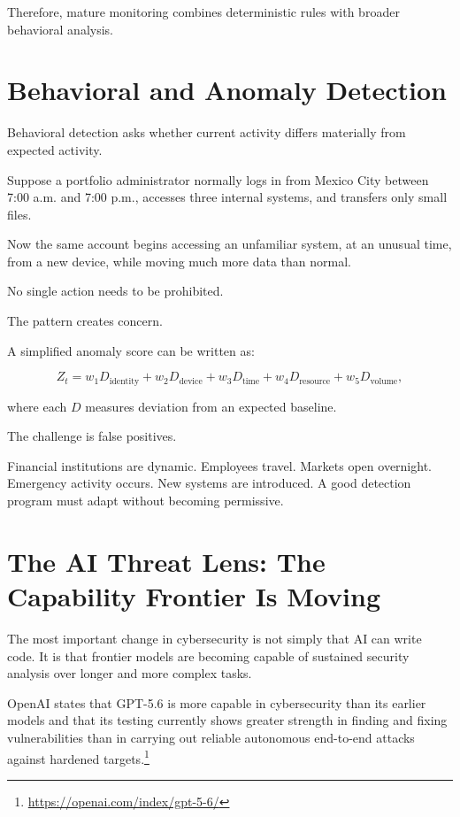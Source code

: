 Therefore, mature monitoring combines deterministic rules with broader behavioral analysis.

\section{Behavioral and Anomaly Detection}

Behavioral detection asks whether current activity differs materially from expected activity.

Suppose a portfolio administrator normally logs in from Mexico City between 7:00 a.m. and 7:00 p.m., accesses three internal systems, and transfers only small files.

Now the same account begins accessing an unfamiliar system, at an unusual time, from a new device, while moving much more data than normal.

No single action needs to be prohibited.

The pattern creates concern.

A simplified anomaly score can be written as:

\begin{equation}
Z_t =
w_1 D_{\text{identity}}
+
w_2 D_{\text{device}}
+
w_3 D_{\text{time}}
+
w_4 D_{\text{resource}}
+
w_5 D_{\text{volume}},
\end{equation}

where each \(D\) measures deviation from an expected baseline.

The challenge is false positives.

Financial institutions are dynamic. Employees travel. Markets open overnight. Emergency activity occurs. New systems are introduced. A good detection program must adapt without becoming permissive.

\section{The AI Threat Lens: The Capability Frontier Is Moving}

The most important change in cybersecurity is not simply that AI can write code. It is that frontier models are becoming capable of sustained security analysis over longer and more complex tasks.

OpenAI states that GPT-5.6 is more capable in cybersecurity than its earlier models and that its testing currently shows greater strength in finding and fixing vulnerabilities than in carrying out reliable autonomous end-to-end attacks against hardened targets.\footnote{\url{https://openai.com/index/gpt-5-6/}}

